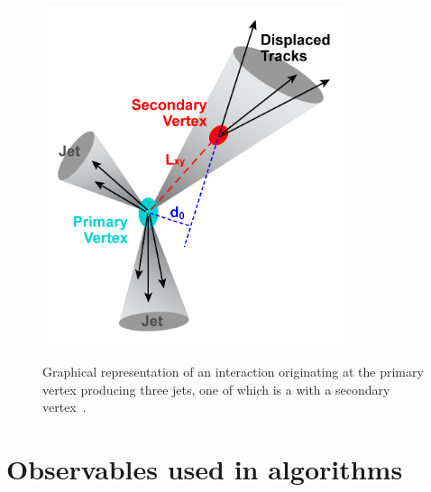 \begin{figure}[hbtp]
   \centering
     \includegraphics[width=0.8\textwidth]{Chapters/04_Analysis/04a_BTags/Images/b_tagging_graphic}\\
     \caption[Graphical representation of a secondary vertex.]{Graphical representation of an
     interaction originating at the primary vertex producing three jets, one of which is a \bjet with a
     secondary vertex~\cite{d0_fnal}.}
     \label{fig:secondary_vertex}
\end{figure}

\section{Observables used in \btagging algorithms}
\label{s:observables_used_in_btagging_algorithms}

